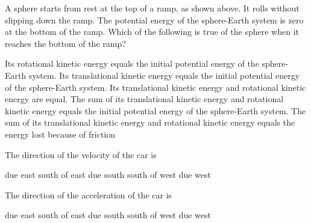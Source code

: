 \documentclass[12pt]{../../oss-apphys-exam}
\begin{document}
\begin{questions}
  
  \question A sphere starts from rest at the top of a ramp, as shown above. It
  rolls without slipping down the ramp. The potential energy of the sphere-Earth
  system is zero at the bottom of the ramp. Which of the following is true of
  the sphere when it reaches the bottom of the ramp?
  \begin{choices}
    \choice Its rotational kinetic energy equals the initial potential energy
    of the sphere-Earth system.
    \choice Its translational kinetic energy equals the initial potential
    energy of the sphere-Earth system.
    \choice Its translational kinetic energy and rotational kinetic energy are
    equal.
    \choice The sum of its translational kinetic energy and rotational kinetic
    energy equals the initial potential energy of the sphere-Earth system.
    \choice The sum of its translational kinetic energy and rotational kinetic
    energy equals the energy lost because of friction
  \end{choices}
  \newpage
  

  \question The direction of the velocity of the car is
  \label{car1}
  \begin{choices}
    \choice due east
    \choice south of east
    \choice due south
    \choice south of west
    \choice due west
  \end{choices}

  \question The direction of the acceleration of the car is
  \begin{choices}
    \choice due east
    \choice south of east
    \choice due south
    \choice south of west
    \choice due west
  \end{choices}
  

\end{questions}
\end{document}
